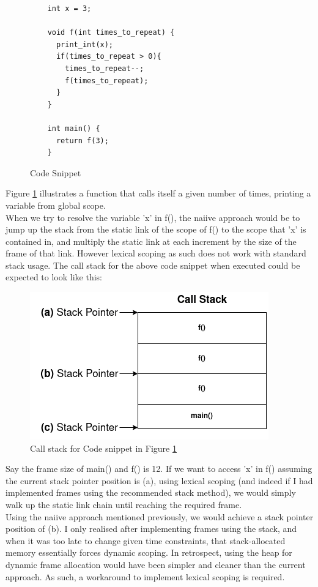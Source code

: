 \documentclass[12pt]{article}
\begin{document}
\begin{figure}[H]
  \begin{verbatim}
    int x = 3;

    void f(int times_to_repeat) { 
      print_int(x);
      if(times_to_repeat > 0){
        times_to_repeat--;
        f(times_to_repeat);
      }
    }

    int main() {
      return f(3);
    }
  \end{verbatim}
  \caption{Code Snippet}
  \label{stackproblem}
\end{figure}
Figure \ref{stackproblem} illustrates a function that calls itself a given number of times, printing a variable from global scope. \\\newline
When we try to resolve the variable 'x' in f(), the naiive approach would be to jump up the stack from the static link of the scope of f() to the scope that 'x' is contained in, and multiply the static link at each increment by the size of the frame of that link. However lexical scoping as such does not work with standard stack usage. The call stack for the above code snippet when executed could be expected to look like this:
\begin{figure}[H]
  \centering
  \includegraphics[scale=0.5]{2.png}
  \caption{Call stack for Code snippet in Figure \ref{stackproblem}}
  \label{callstack}
\end{figure}
Say the frame size of main() and f() is 12. If we want to access 'x' in f() assuming the current stack pointer position is (a), using lexical scoping (and indeed if I had implemented frames using the recommended stack method), we would simply walk up the static link chain until reaching the required frame. \\\newline 
Using the naiive approach mentioned previously, we would achieve a stack pointer position of (b). I only realised after implementing frames using the stack, and when it was too late to change given time constraints, that stack-allocated memory essentially forces dynamic scoping. In retrospect, using the heap for dynamic frame allocation would have been simpler and cleaner than the current approach. As such, a workaround to implement lexical scoping is required. \\\newline 
\end{document}
